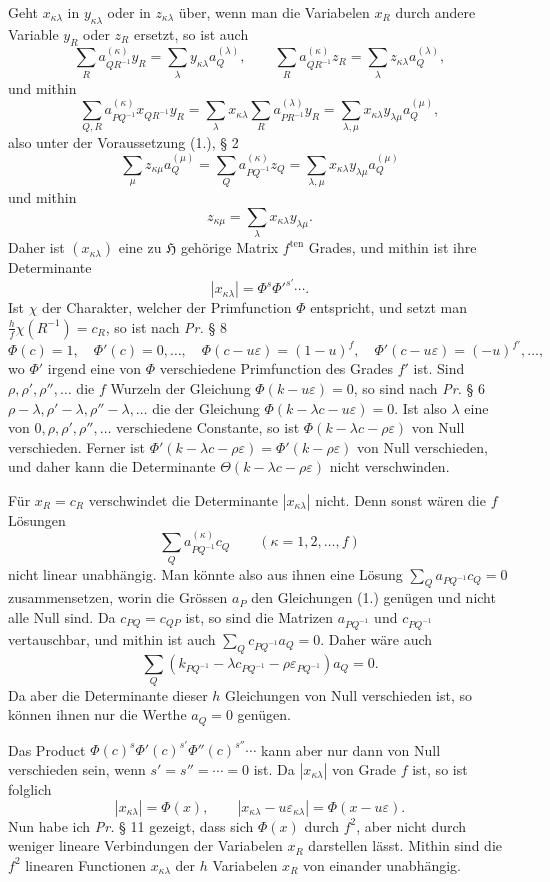 \documentclass[11pt]{article}
\newcommand{\Hgrp}{\mathfrak{H}}
\newcommand{\eps}{\varepsilon}
\newcommand{\ten}{\mathrm{ten}}
\begin{document}
Geht $x_{\kappa\lambda}$ in $y_{\kappa\lambda}$ oder in $z_{\kappa\lambda}$ über, wenn man die Variabelen $x_R$ durch andere Variable $y_R$ oder $z_R$ ersetzt, so ist auch
\[
\sum_R a^{(\kappa)}_{QR^{-1}}y_R=\sum_\lambda y_{\kappa\lambda}a^{(\lambda)}_Q,
\qquad
\sum_R a^{(\kappa)}_{QR^{-1}}z_R=\sum_\lambda z_{\kappa\lambda}a^{(\lambda)}_Q,
\]
und mithin
\[
\sum_{Q,R} a^{(\kappa)}_{PQ^{-1}}x_{QR^{-1}}y_R
=\sum_\lambda x_{\kappa\lambda}\sum_R a^{(\lambda)}_{PR^{-1}}y_R
=\sum_{\lambda,\mu}x_{\kappa\lambda}y_{\lambda\mu}a^{(\mu)}_Q,
\]
also unter der Voraussetzung (1.), § 2
\[
\sum_\mu z_{\kappa\mu}a^{(\mu)}_Q
=\sum_Q a^{(\kappa)}_{PQ^{-1}}z_Q
=\sum_{\lambda,\mu}x_{\kappa\lambda}y_{\lambda\mu}a^{(\mu)}_Q
\]
und mithin
\[
z_{\kappa\mu}=\sum_\lambda x_{\kappa\lambda}y_{\lambda\mu}.
\]
Daher ist $(x_{\kappa\lambda})$ eine zu $\Hgrp$ gehörige Matrix $f^{\ten}$ Grades, und mithin ist ihre Determinante
\[
|x_{\kappa\lambda}|=\Phi^s{\Phi'}^{s'}\cdots.
\]
Ist $\chi$ der Charakter, welcher der Primfunction $\Phi$ entspricht, und setzt man $\frac{h}{f}\chi(R^{-1})=c_R$, so ist nach \emph{Pr.} § 8
\[
\Phi(c)=1,
\quad \Phi'(c)=0,\ldots,
\quad \Phi(c-u\eps)=(1-u)^f,
\quad \Phi'(c-u\eps)=(-u)^{f'},\ldots,
\]
wo $\Phi'$ irgend eine von $\Phi$ verschiedene Primfunction des Grades $f'$ ist. Sind $\rho,\rho',\rho'',\ldots$ die $f$ Wurzeln der Gleichung $\Phi(k-u\eps)=0$, so sind nach \emph{Pr.} § 6 $\rho-\lambda,\rho'-\lambda,\rho''-\lambda,\ldots$ die der Gleichung $\Phi(k-\lambda c-u\eps)=0$. Ist also $\lambda$ eine von $0,\rho,\rho',\rho'',\ldots$ verschiedene Constante, so ist $\Phi(k-\lambda c-\rho\eps)$ von Null verschieden. Ferner ist $\Phi'(k-\lambda c-\rho\eps)=\Phi'(k-\rho\eps)$ von Null verschieden, und daher kann die Determinante $\Theta(k-\lambda c-\rho\eps)$ nicht verschwinden.

Für $x_R=c_R$ verschwindet die Determinante $|x_{\kappa\lambda}|$ nicht. Denn sonst wären die $f$ Lösungen
\[
\sum_Q a^{(\kappa)}_{PQ^{-1}}c_Q\qquad(\kappa=1,2,\ldots,f)
\]
nicht linear unabhängig. Man könnte also aus ihnen eine Lösung $\sum_Q a_{PQ^{-1}}c_Q=0$ zusammensetzen, worin die Grössen $a_P$ den Gleichungen (1.) genügen und nicht alle Null sind. Da $c_{PQ}=c_{QP}$ ist, so sind die Matrizen $a_{PQ^{-1}}$ und $c_{PQ^{-1}}$ vertauschbar, und mithin ist auch $\sum_Q c_{PQ^{-1}}a_Q=0$. Daher wäre auch
\[
\sum_Q(k_{PQ^{-1}}-\lambda c_{PQ^{-1}}-\rho\eps_{PQ^{-1}})a_Q=0.
\]
Da aber die Determinante dieser $h$ Gleichungen von Null verschieden ist, so können ihnen nur die Werthe $a_Q=0$ genügen.

Das Product $\Phi(c)^s{\Phi'}(c)^{s'}{\Phi''}(c)^{s''}\cdots$ kann aber nur dann von Null verschieden sein, wenn $s'=s''=\cdots=0$ ist. Da $|x_{\kappa\lambda}|$ von Grade $f$ ist, so ist folglich
\begin{equation}\tag{3.}
|x_{\kappa\lambda}|=\Phi(x),\qquad |x_{\kappa\lambda}-u\eps_{\kappa\lambda}|=\Phi(x-u\eps).
\end{equation}
Nun habe ich \emph{Pr.} § 11 gezeigt, dass sich $\Phi(x)$ durch $f^2$, aber nicht durch weniger lineare Verbindungen der Variabelen $x_R$ darstellen lässt. Mithin sind die $f^2$ linearen Functionen $x_{\kappa\lambda}$ der $h$ Variabelen $x_R$ von einander unabhängig.
\end{document}
